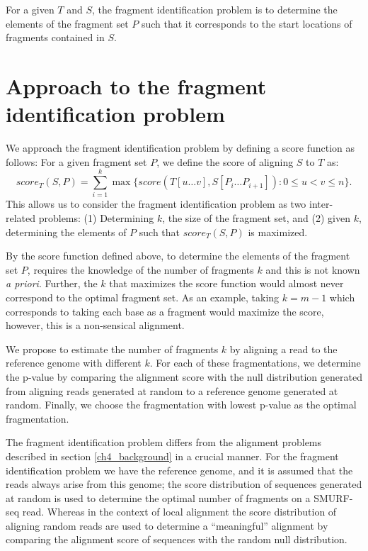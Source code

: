 For a given $T$ and $S$, the fragment identification problem is to
determine the elements of the fragment set $P$ such that it corresponds
to the start locations of fragments contained in $S$.



\section{Approach to the fragment identification problem}
We approach the fragment identification problem by defining a score
function as follows:
For a given fragment set $P$, we define the score of aligning $S$ to $T$
as: \[score_T(S,P) = \sum_{i=1}^{k} \max\{score(T[u \dots v], S[P_i
\dots P_{i+1}]): 0 \leq u < v \leq n\}.\]
%
This allows us to consider the fragment identification problem as two
inter-related problems: (1) Determining $k$, the size of the fragment
set, and (2) given $k$, determining the elements of $P$ such that
$score_T(S, P)$ is maximized.

By the score function defined above, to determine the elements of the
fragment set $P$, requires the knowledge of the number of fragments $k$
and this is not known \textit{a priori}. Further, the $k$ that maximizes
the score function would almost never correspond to the optimal fragment
set. As an example, taking $k=m-1$ which corresponds to taking each base
as a fragment would maximize the score, however, this is a non-sensical
alignment.

We propose to estimate the number of fragments $k$ by aligning a read
to the reference genome with different $k$. For each of these
fragmentations, we determine the p-value by comparing the alignment
score with the null distribution generated from aligning reads generated
at random to a reference genome generated at random. Finally, we choose
the fragmentation with lowest p-value as the optimal fragmentation.

The fragment identification problem differs from the alignment problems
described in section \ref{ch4_background} in a crucial manner. For the
fragment identification problem we have the reference genome, and it is
assumed that the reads always arise from this genome; the score
distribution of sequences generated at random is used to determine the
optimal number of fragments on a SMURF-seq read. Whereas in the context
of local alignment the score distribution of aligning random reads are
used to determine a ``meaningful'' alignment by comparing the alignment
score of sequences with the random null distribution.



